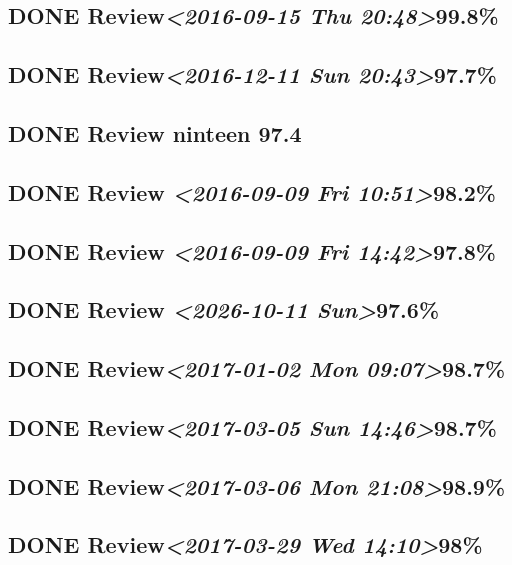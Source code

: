 \documentclass[11pt]{ctexart}
\begin{document}
\subsection{{\bfseries\sffamily DONE} Review\textit{<2016-09-15 Thu 20:48>}99.8\%}
\label{sec:org151ce08}
\subsection{{\bfseries\sffamily DONE} Review\textit{<2016-12-11 Sun 20:43>}97.7\%}
\label{sec:org37d579b}

\subsection{{\bfseries\sffamily DONE} Review ninteen 97.4}
\label{sec:orgfef33d2}

\subsection{{\bfseries\sffamily DONE} Review \textit{<2016-09-09 Fri 10:51>}98.2\%}
\label{sec:org6e041e6}
\subsection{{\bfseries\sffamily DONE} Review \textit{<2016-09-09 Fri 14:42>}97.8\%}
\label{sec:org96de117}
\subsection{{\bfseries\sffamily DONE} Review \textit{<2026-10-11 Sun>}97.6\%}
\label{sec:org983add4}
\subsection{{\bfseries\sffamily DONE} Review\textit{<2017-01-02 Mon 09:07>}98.7\%}
\label{sec:orgf0feaf5}
\subsection{{\bfseries\sffamily DONE} Review\textit{<2017-03-05 Sun 14:46>}98.7\%}
\label{sec:org6ada7a7}
\subsection{{\bfseries\sffamily DONE} Review\textit{<2017-03-06 Mon 21:08>}98.9\%}
\label{sec:org0a1eafd}
\subsection{{\bfseries\sffamily DONE} Review\textit{<2017-03-29 Wed 14:10>}98\%}
\label{sec:org278a49b}
\end{document}
